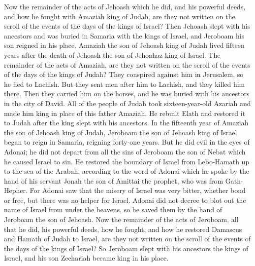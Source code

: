 \begin{biblechapter}
\verse Now the remainder of the acts of Jehoash which he did, and his powerful deeds, and how he fought with Amaziah king of Judah, are they not written on the scroll of the events of the days of the kings of Israel?
\verse Then Jehoash slept with his ancestors and was buried in Samaria with the kings of Israel, and Jeroboam his son reigned in his place.
 Amaziah the son of Jehoash king of Judah lived fifteen years after the death of Jehoash the son of Jehoahaz king of Israel.
\verse The remainder of the acts of Amaziah, are they not written on the scroll of the events of the days of the kings of Judah?
\verse They conspired against him in Jerusalem, so he fled to Lachish. But they sent men after him to Lachish, and they killed him there.
\verse Then they carried him on the horses, and he was buried with his ancestors in the city of David.
\verse All of the people of Judah took sixteen-year-old Azariah and made him king in place of this father Amaziah.
\verse He rebuilt Elath and restored it to Judah after the king slept with his ancestors.
\verse In the fifteenth year of Amaziah the son of Jehoash king of Judah, Jeroboam the son of Jehoash king of Israel began to reign in Samaria, reigning forty-one years.
\verse But he did evil in the eyes of Adonai; he did not depart from all the sins of Jeroboam the son of Nebat which he caused Israel to sin.
\verse He restored the boundary of Israel from Lebo-Hamath up to the sea of the Arabah, according to the word of Adonai which he spoke by the hand of his servant Jonah the son of Amittai the prophet, who was from Gath-Hepher.
\verse For Adonai saw that the misery of Israel was very bitter, whether bond or free, but there was no helper for Israel.
\verse Adonai did not decree to blot out the name of Israel from under the heavens, so he saved them by the hand of Jeroboam the son of Jehoash.
\verse Now the remainder of the acts of Jeroboam, all that he did, his powerful deeds, how he fought, and how he restored Damascus and Hamath of Judah to Israel, are they not written on the scroll of the events of the days of the kings of Israel?
\verse So Jeroboam slept with his ancestors the kings of Israel, and his son Zechariah became king in his place.
\end{biblechapter}


